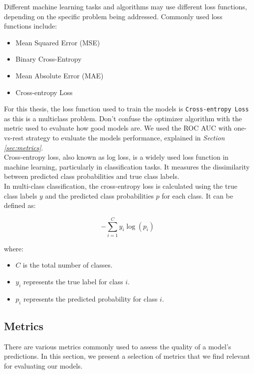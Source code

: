 Different machine learning tasks and algorithms may use different loss functions, depending on the specific problem being addressed. Commonly used loss functions include:

\begin{itemize}
    \item Mean Squared Error (MSE)
    \item Binary Cross-Entropy
    \item Mean Absolute Error (MAE)
    \item Cross-entropy Loss
\end{itemize}

For this thesis, the loss function used to train the models is
{\tt Cross-entropy Loss} as this is a multiclass problem. Don't confuse the optimizer
algorithm with the metric used to evaluate how good models are.
We used the ROC AUC with one-vs-rest strategy to evaluate the models performance, explained in \textit{Section \ref{sec:metrics}}. \\

Cross-entropy loss, also known as log loss, is a widely used loss function in machine learning, particularly in classification tasks. It measures the dissimilarity between predicted class probabilities and true class labels. \\

In multi-class classification, the cross-entropy loss is calculated using the true class labels \(y\) and the predicted class probabilities \(p\) for each class. It can be defined as:

\[-\sum_{i=1}^{C} y_i \log(p_i)\]

\noindent where:

\begin{itemize}
    \item \(C\) is the total number of classes.
    \item \(y_i\) represents the true label for class \(i\).
    \item \(p_i\) represents the predicted probability for class \(i\).
\end{itemize}

\subsection{Metrics}
{\label{sec:metrics}}

There are various metrics commonly used to assess the quality of a model's predictions.
In this section, we present a selection of metrics that we find relevant for evaluating our models.

